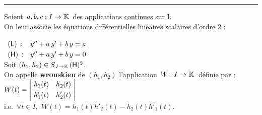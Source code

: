 \vspace{1cm}

\hrule

\vspace{1.5cm}

Soient \(\,a,b,c:I\to\mathbb{K}\,\) des applications \underline{continues} sur I.\vspace{-0.45cm}\\
On leur associe les équations différentielles linéaires scalaires d'ordre 2 : \(
\begin{array}{ll}
    & \\
    (\mathsf{L})\,: & y'' +a\,y' +b\,y=c\vspace{0.1cm} \\
    (\mathsf{H})\,: & y'' +a\,y' +b\,y=0
\end{array}\)\vspace{0.5cm}\\
Soit \((h_1,h_2)\in S_{\,I\to \mathbb{K}}\,(\mathsf{H})^2\).\vspace{-0.1cm}\\
On appelle \textbf{wronskien} de $(h_1,h_2)$ l'application \(\,W:I\to \mathbb{K}\,\) définie par : \(W(t)=\left|\!
\begin{array}{cc}
    h_1(t) & h_2(t)\vspace{0.1cm}\\
    h'_1(t) & h'_2(t)
\end{array}\!\right|\)\\
i.e. \(\, \forall t\in I,\ \, W(t) = h_1(t)h'_2(t)-h_2(t)h'_1(t).\)


\newpage

\printindex
